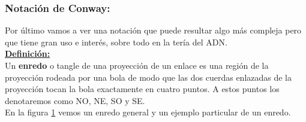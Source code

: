 \documentclass[14pt]{extarticle}
\begin{document}
\begin{center}
	\item \subsubsection{Notación de Conway:}
\end{center}
Por último vamos a ver una notación que puede resultar algo más compleja pero que tiene gran uso e interés, sobre todo en la tería del ADN. \\

\underline{\textbf{Definición:}}\\
Un \textbf{enredo} o tangle de una proyección de un enlace es una región de la proyección rodeada por una bola de modo que las dos cuerdas enlazadas de la proyección tocan la bola exactamente en cuatro puntos. A estos puntos los denotaremos como NO, NE, SO y SE.\\

En la figura \ref{conw1} vemos un enredo general y un ejemplo particular de un enredo.\\
   \begin{figure}[h!]
   	\centering
   	\caption{}
   	\label{conw1} 
   \end{figure} 
\end{document}
